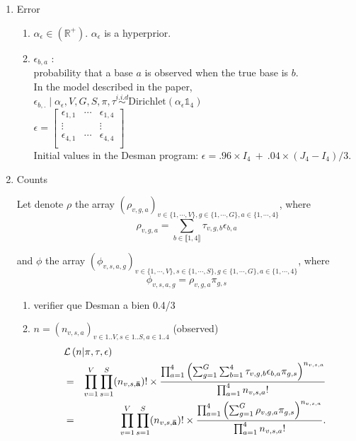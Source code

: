 \documentclass{article}
\newcommand\indexsum[1]{\mathbf{\bar{#1}}}
\begin{document}
\begin{enumerate}
\begin{enumerate}
   
   \end{enumerate}
    \item Error
    \begin{enumerate}
    \item $\alpha_\epsilon\in\left(\mathbb{R}^+\right)$. $\alpha_\epsilon$ is a hyperprior.
    \item $\epsilon_{b,a}$ :\\ probability that a base $a$ is observed when the true base is $b$.\\
    In the model described in the paper, 
    $\epsilon_{b,.}\mid\alpha_\epsilon,V,G,S,\pi,\tau\overset{i.i.d}{\sim}\mathrm{Dirichlet}(\alpha_\epsilon\mathds{1}_4)$ \\
    $\epsilon=\begin{bmatrix}
\epsilon_{1,1}&\cdots&\epsilon_{1,4}\\
\vdots&&\vdots\\
\epsilon_{4,1}&\cdots&\epsilon_{4,4}\\
    \end{bmatrix}$\\
    Initial values in the Desman program: $\epsilon=.96\times I_4~+~.04 \times (J_4-I_4)/3$.
    \end{enumerate}
    \item Counts

    Let denote $\rho$ the array $\left(\rho_{v,g,a}\right)_{v\in\{1,\cdots,V\},g\in\{1,\cdots,G\},a\in\{1,\cdots,4\}}$, where
$$\rho_{v,g,a}=\sum_{b\in\llbracket 1,4\rrbracket}\tau_{v,g,b}\epsilon_{b,a}$$

and $\phi$ the array $\left(\phi_{v,s,a,g}\right)_{v\in\{1,\cdots,V\},s\in\{1,\cdots,S\},g\in\{1,\cdots,G\},a\in\{1,\cdots,4\}}$, where
$$\phi_{v,s,a,g}=\rho_{v,g,a}\pi_{g,s}$$

    \begin{enumerate}

\item {\color{red} verifier que Desman a bien 0.4/3}
    
\item $n=(n_{v,s,a})_{v\in 1..V,s\in 1..S,a\in 1..4}$ (observed)\\
\begin{eqnarray}\lefteqn{\mathcal{L}\left(n | \pi, \tau,\epsilon \right)}\nonumber\\& =& \prod_{v=1}^{V} \prod_{s = 1}^{S} (n_{v,s,\indexsum{a}})!\times\frac{\prod_{a = 1}^{4} \left( \sum_{g = 1}^{G}\sum_{b=1}^{4} \tau_{v,g,b}\epsilon_{b,a} \pi_{g,s}  \right)^{n_{v,s,a}}}{\prod_{a = 1}^{4}n_{v,s,a}!}\nonumber\\
& =&\prod_{v=1}^{V} \prod_{s = 1}^{S} (n_{v,s,\indexsum{a}})!\times\frac{\prod_{a = 1}^{4} \left( \sum_{g = 1}^{G} \rho_{v,g,a} \pi_{g,s}  \right)^{n_{v,s,a}}}{\prod_{a = 1}^{4}n_{v,s,a}!}.\label{eq:likelihood}\end{eqnarray}


\end{enumerate}
\end{enumerate}
\end{document}
